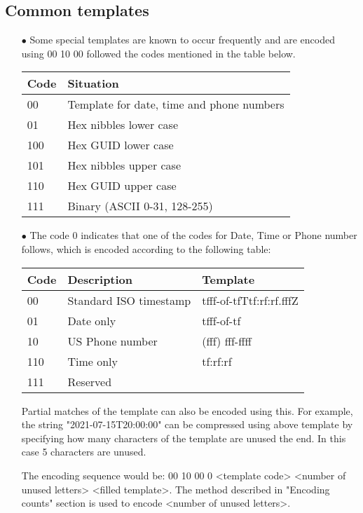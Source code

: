 \documentclass[]{article}
\begin{document}
\subsection{Common templates}
\begin{itemize}
	\item[$\bullet$] Some special templates are known to occur frequently and are encoded using 00 10 00 followed the codes mentioned in the table below.
	\item[] 
		\begin{tabular}{ | l | l |} \hline
		\textbf{Code} & \textbf{Situation} \\ \hline
		00 & Template for date, time and phone numbers \\ \hline
		01 & Hex nibbles lower case \\ \hline
		100 & Hex GUID lower case \\ \hline
		101 & Hex nibbles upper case \\ \hline
		110 & Hex GUID upper case \\ \hline
		111 & Binary (ASCII 0-31, 128-255) \\ \hline
		\end{tabular}
	\item[$\bullet$] The code 0 indicates that one of the codes for Date, Time or Phone number follows, which is encoded according to the following table:
	\item[] 
		\begin{tabular}{ | l | l | l |} \hline
		\textbf{Code} & \textbf{Description} & \textbf{Template} \\ \hline
		00 & Standard ISO timestamp & tfff-of-tfTtf:rf:rf.fffZ \\ \hline
		01 & Date only & tfff-of-tf \\ \hline
		10 & US Phone number & (fff) fff-ffff \\ \hline
		110 & Time only & tf:rf:rf \\ \hline
		111 & Reserved \\ \hline
		\end{tabular}
	\item[]Partial matches of the template can also be encoded using this. For example, the string "2021-07-15T20:00:00" can be compressed using above template by specifying how many characters of the template are unused the end. In this case 5 characters are unused.
	\item[]The encoding sequence would be: 00 10 00 0 <template code> <number of unused letters> <filled template>. The method described in "Encoding counts" section is used to encode <number of unused letters>.

\end{itemize}
\end{document}

